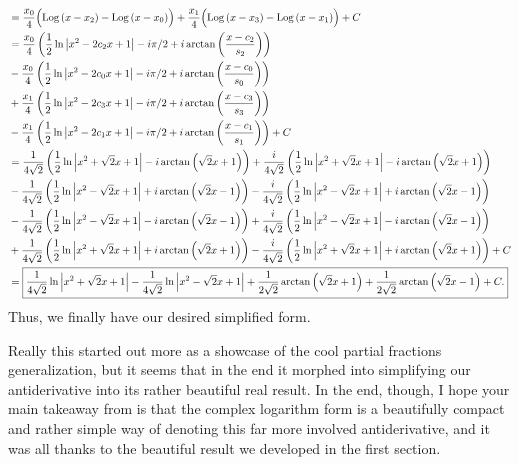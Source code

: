 \begin{align*}
    &= \frac{x_0}{4} \Bigl( \operatorname{Log}{\left( x - x_2 \right)} - \operatorname{Log}{\left( x - x_0 \right)} \Bigr) + \frac{x_1}{4} \Bigl( \operatorname{Log}{\left( x - x_3 \right)} - \operatorname{Log}{\left( x - x_1 \right)} \Bigr) + C \\
    &= \frac{x_0}{4} \left( \frac{1}{2} \ln{\ensuremath{\left\lvert x^2 - 2c_2 x + 1 \right\rvert}} - i \pi/2 + i\arctan{\left( \frac{x - c_2}{s_2} \right)} \right) \\
    &- \frac{x_0}{4} \left( \frac{1}{2} \ln{\ensuremath{\left\lvert x^2 - 2c_0 x + 1 \right\rvert}} - i \pi/2 + i\arctan{\left( \frac{x - c_0}{s_0} \right)} \right) \\
    &+ \frac{x_1}{4} \left( \frac{1}{2} \ln{\ensuremath{\left\lvert x^2 - 2c_3 x + 1 \right\rvert}} - i \pi/2 + i\arctan{\left( \frac{x - c_3}{s_3} \right)} \right) \\
    &- \frac{x_1}{4} \left( \frac{1}{2} \ln{\ensuremath{\left\lvert x^2 - 2c_1 x + 1 \right\rvert}} - i \pi/2 + i\arctan{\left( \frac{x - c_1}{s_1} \right)} \right) + C \\
    &= \frac{1}{4 \sqrt{2}} \left( \frac{1}{2} \ln{\ensuremath{\left\lvert x^2 + \sqrt{2} x + 1 \right\rvert}} - i\arctan{\left( \sqrt{2} x + 1 \right)} \right) + \frac{i}{4 \sqrt{2}} \left( \frac{1}{2} \ln{\ensuremath{\left\lvert x^2 + \sqrt{2} x + 1 \right\rvert}} - i\arctan{\left( \sqrt{2} x + 1 \right)} \right) \\
    &- \frac{1}{4 \sqrt{2}} \left( \frac{1}{2} \ln{\ensuremath{\left\lvert x^2 - \sqrt{2} x + 1 \right\rvert}} + i\arctan{\left( \sqrt{2} x - 1 \right)} \right) - \frac{i}{4 \sqrt{2}} \left( \frac{1}{2} \ln{\ensuremath{\left\lvert x^2 - \sqrt{2} x + 1 \right\rvert}} + i\arctan{\left( \sqrt{2} x - 1 \right)} \right) \\
    &- \frac{1}{4 \sqrt{2}} \left( \frac{1}{2} \ln{\ensuremath{\left\lvert x^2 - \sqrt{2} x + 1 \right\rvert}} - i\arctan{\left( \sqrt{2} x - 1 \right)} \right) + \frac{i}{4 \sqrt{2}} \left( \frac{1}{2} \ln{\ensuremath{\left\lvert x^2 - \sqrt{2} x + 1 \right\rvert}} - i\arctan{\left( \sqrt{2} x - 1 \right)} \right) \\
    &+ \frac{1}{4 \sqrt{2}} \left( \frac{1}{2} \ln{\ensuremath{\left\lvert x^2 + \sqrt{2} x + 1 \right\rvert}} + i\arctan{\left( \sqrt{2} x + 1 \right)} \right) - \frac{i}{4 \sqrt{2}} \left( \frac{1}{2} \ln{\ensuremath{\left\lvert x^2 + \sqrt{2} x + 1 \right\rvert}} + i\arctan{\left( \sqrt{2} x + 1 \right)} \right) + C \\
    &= \boxed{\frac{1}{4 \sqrt{2}} \ln{\ensuremath{\left\lvert x^2 + \sqrt{2} x + 1 \right\rvert}} - \frac{1}{4 \sqrt{2}} \ln{\ensuremath{\left\lvert x^2 - \sqrt{2} x + 1 \right\rvert}} + \frac{1}{2 \sqrt{2}} \arctan{\left( \sqrt{2} x + 1\right) } + \frac{1}{2 \sqrt{2}} \arctan{\left( \sqrt{2} x - 1 \right)} + C.}
\end{align*}
Thus, we finally have our desired simplified form. 

Really this started out more as a showcase of the cool partial fractions
generalization, but it seems that in the end it morphed into simplifying our
antiderivative into its rather beautiful real result. In the end, though, I
hope your main takeaway from is that the complex logarithm form is a
beautifully compact and rather simple way of denoting this far more involved
antiderivative, and it was all thanks to the beautiful result we developed in
the first section.
